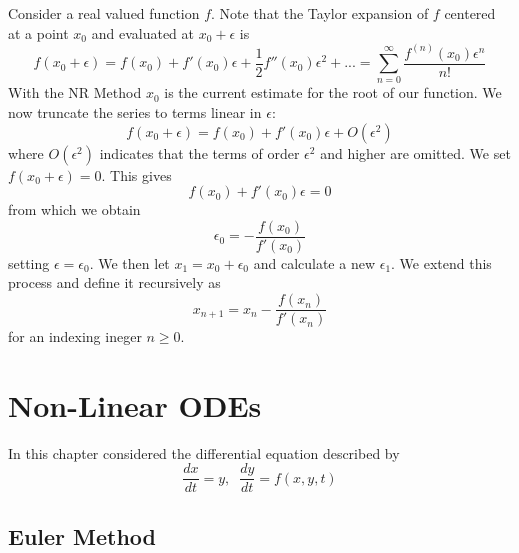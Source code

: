 \documentclass[12pt, a4paper, oneside, openright, titlepage]{book}
\begin{document}
\begin{proc}
        Consider a real valued function $f$. Note that the Taylor expansion of $f$ centered at a point $x_0$ and evaluated at $x_0 + \epsilon$ is \begin{equation}
                f(x_0+\epsilon) = f(x_0) + f'(x_0)\epsilon + \frac{1}{2}f''(x_0)\epsilon^2 + ... = \sum_{n=0}^{\infty}\frac{f^{(n)}(x_0)\epsilon^n}{n!}
        \end{equation}
        With the NR Method $x_0$ is the current estimate for the root of our function. We now truncate the series to terms linear in $\epsilon$: \begin{equation}
                f(x_0+\epsilon) = f(x_0) + f'(x_0)\epsilon + O(\epsilon^2)
        \end{equation}
        where $O(\epsilon^2)$ indicates that the terms of order $\epsilon^2$ and higher are omitted. We set $f(x_0+\epsilon) = 0$. This gives \begin{equation}
                f(x_0) + f'(x_0)\epsilon = 0
        \end{equation}
        from which we obtain \begin{equation}
                \epsilon_0 = -\frac{f(x_0)}{f'(x_0)}
        \end{equation}
        setting $\epsilon = \epsilon_0$. We then let $x_1 = x_0 + \epsilon_0$ and calculate a new $\epsilon_1$. We extend this process and define it recursively as \begin{equation}
                x_{n+1} = x_n - \frac{f(x_n)}{f'(x_n)}
        \end{equation}
        for an indexing ineger $n \geq 0$.
\end{proc}




\chapter{Non-Linear ODEs}

\begin{rmk}
        In this chapter considered the differential equation described by \begin{equation}
                \frac{dx}{dt} = y, \;\;\frac{dy}{dt} = f(x,y,t)
        \end{equation}
\end{rmk}


\section{Euler Method}
\end{document}
